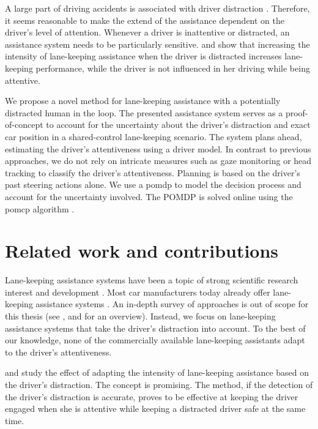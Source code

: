 A large part of driving accidents is associated with driver distraction \parencite{distracted_nhtsa}. Therefore, it seems reasonable to make the extend of the assistance dependent on the driver's level of attention. Whenever a driver is inattentive or distracted, an assistance system needs to be particularly sensitive. \cite{disracted-lane-keeping-1} and \cite{disracted-lane-keeping-2} show that increasing the intensity of lane-keeping assistance when the driver is distracted increases lane-keeping performance, while the driver is not influenced in her driving while being attentive. 

We propose a novel method for lane-keeping assistance with a potentially distracted human in the loop. The presented assistance system serves as a proof-of-concept to account for the uncertainty about the driver's distraction and exact car position in a shared-control lane-keeping scenario. The system plans ahead, estimating the driver's attentiveness using a driver model. In contrast to previous approaches, we do not rely on intricate measures such as gaze monitoring or head tracking to classify the driver's attentiveness. Planning is based on the driver's past steering actions alone. We use a \Gls{pomdp} to model the decision process and account for the uncertainty involved. The POMDP is solved online using the \Gls{pomcp} algorithm \parencite{pomcp}.

\section{Related work and contributions}

Lane-keeping assistance systems have been a topic of strong scientific research interest and development \parencite{lane-keeping-road-boundary-detection}. Most car manufacturers today already offer lane-keeping assistance systems \parencite{lane-keeping-widely-used}. An in-depth survey of approaches is out of scope for this thesis (see \cite{driver-assistance-review-2}, and \cite{driver-assistance-review} for an overview). Instead, we focus on lane-keeping assistance systems that take the driver's distraction into account. To the best of our knowledge, none of the commercially available lane-keeping assistants adapt to the driver's attentiveness. 

\cite{disracted-lane-keeping-1} and \cite{disracted-lane-keeping-2} study the effect of adapting the intensity of lane-keeping assistance based on the driver's distraction. The concept is promising. The method, if the detection of the driver's distraction is accurate, proves to be effective at keeping the driver engaged when she is attentive while keeping a distracted driver safe at the same time.

